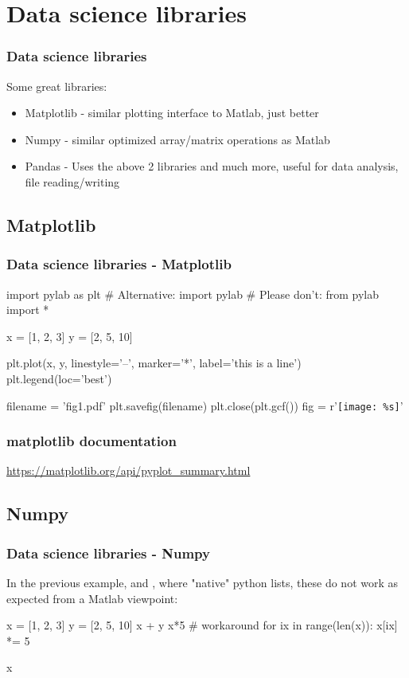 \documentclass[12pt]{beamer}
\begin{document}
\section{Data science libraries}
\begin{frame}[fragile]
\frametitle{Data science libraries}
Some great libraries:
\begin{itemize}
\item Matplotlib - similar plotting interface to Matlab, just better
\item Numpy - similar optimized array/matrix operations as Matlab
\item Pandas - Uses the above 2 libraries and much more, useful for data analysis, file reading/writing
\end{itemize}
\end{frame}

\subsection{Matplotlib}
\begin{frame}[fragile]
\frametitle{Data science libraries - Matplotlib}
\begin{pyblock}
import pylab as plt
# Alternative: import pylab
# Please don't: from pylab import *

x = [1, 2, 3]
y = [2, 5, 10]

plt.plot(x, y, linestyle='--', marker='*', 
	label='this is a line')
plt.legend(loc='best')
\end{pyblock}
\begin{pycode}
filename = 'fig1.pdf'
plt.savefig(filename)
plt.close(plt.gcf())
fig = r'\texttt{[image: \%s]}' %
\end{pycode}
\end{frame}

\begin{frame}[fragile]
\end{frame}

\begin{frame}[fragile]
\frametitle{matplotlib documentation}
\url{https://matplotlib.org/api/pyplot_summary.html}
\end{frame}

\subsection{Numpy}
\begin{frame}[fragile]
\frametitle{Data science libraries - Numpy}
In the previous example,  and , where "native" python lists, these do not work as expected from a Matlab viewpoint:
\begin{pyconsole}
x = [1, 2, 3]
y = [2, 5, 10]
x + y
x*5
# workaround
for ix in range(len(x)):
  x[ix] *= 5

x
\end{pyconsole}
\end{frame}
\end{document}
